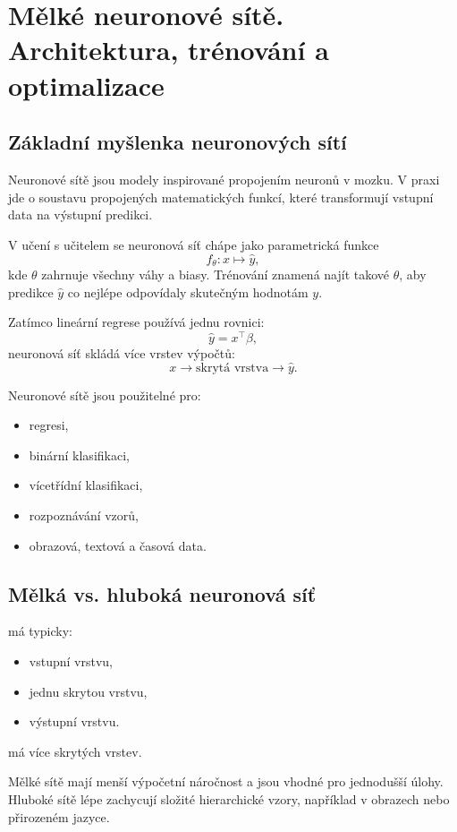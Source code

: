 \section{Mělké neuronové sítě. Architektura, trénování a optimalizace}


\subsection{Základní myšlenka neuronových sítí}

Neuronové sítě jsou modely inspirované propojením neuronů v mozku. V praxi jde o soustavu propojených
matematických funkcí, které transformují vstupní data na výstupní predikci.

V učení s učitelem se neuronová síť chápe jako parametrická funkce
\[
f_\theta:x\mapsto \hat{y},
\]
kde $\theta$ zahrnuje všechny váhy a biasy. Trénování znamená najít takové $\theta$, aby predikce $\hat{y}$
co nejlépe odpovídaly skutečným hodnotám $y$.

Zatímco lineární regrese používá jednu rovnici:
\[
\hat{y}=x^\top \beta,
\]
neuronová síť skládá více vrstev výpočtů:
\[
x \rightarrow \text{skrytá vrstva} \rightarrow \hat{y}.
\]

Neuronové sítě jsou použitelné pro:
\begin{itemize}
    \item regresi,
    \item binární klasifikaci,
    \item vícetřídní klasifikaci,
    \item rozpoznávání vzorů,
    \item obrazová, textová a časová data.
\end{itemize}

\subsection{Mělká vs. hluboká neuronová síť}

 má typicky:
\begin{itemize}
    \item vstupní vrstvu,
    \item jednu skrytou vrstvu,
    \item výstupní vrstvu.
\end{itemize}

 má více skrytých vrstev.

Mělké sítě mají menší výpočetní náročnost a jsou vhodné pro jednodušší úlohy. Hluboké sítě lépe zachycují
složité hierarchické vzory, například v obrazech nebo přirozeném jazyce.

